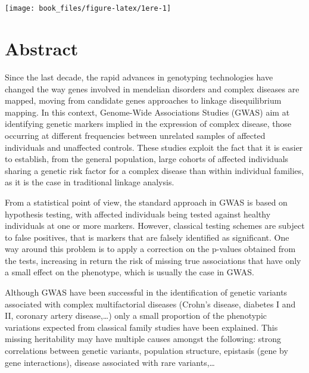 \documentclass[]{book}
\author{}
\date{\vspace{-2.5em}}
\begin{document}
{
\setcounter{tocdepth}{1}
\tableofcontents
}
\hypertarget{section}{%
\chapter*{}\label{section}}

\begin{center}\texttt{[image: book\_files/figure-latex/1ere-1]} \end{center}

\hypertarget{abstract}{%
\chapter*{Abstract}\label{abstract}}

Since the last decade, the rapid advances in genotyping technologies have changed the way genes involved in mendelian disorders and complex diseases are mapped, moving from candidate genes approaches to linkage disequilibrium mapping. In this context, Genome-Wide Associations Studies (GWAS) aim at identifying genetic markers implied in the expression of complex disease, those occurring at different frequencies between unrelated samples of affected individuals and unaffected controls. These studies exploit the fact that it is easier to establish, from the general population, large cohorts of affected individuals sharing a genetic risk factor for a complex disease than within individual families, as it is the case in traditional linkage analysis.

From a statistical point of view, the standard approach in GWAS is based on hypothesis testing, with affected individuals being tested against healthy individuals at one or more markers. However, classical testing schemes are subject to false positives, that is markers that are falsely identified as significant. One way around this problem is to apply a correction on the p-values obtained from the tests, increasing in return the risk of missing true associations that have only a small effect on the phenotype, which is usually the case in GWAS.

Although GWAS have been successful in the identification of genetic variants associated with complex multifactorial diseases (Crohn's disease, diabetes I and II, coronary artery disease,\ldots{}) only a small proportion of the phenotypic variations expected from classical family studies have been explained. This missing heritability may have multiple causes amongst the following: strong correlations between genetic variants, population structure, epistasis (gene by gene interactions), disease associated with rare variants,\dots
\end{document}
